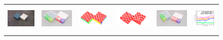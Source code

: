 \begin{figure}[t!]  %
  \begin{centering} 
    \begin{tabular}{p{}p{}p{}p{}p{}p{}}
    \includegraphics[height=1.35cm]{figures/scene1/image_before.jpg}
&    \includegraphics[height=1.35cm]{figures/scene1/pcl_before.png}
&    \includegraphics[height=1.35cm]{figures/scene1/segments.png}
&    \includegraphics[height=1.35cm]{figures/scene1/labels.png}
&    \includegraphics[height=1.35cm]{figures/scene1/pcl_after.png}    
&    \includegraphics[height=1.35cm]{figures/scene1/distances.png}\\


\end{tabular}
\end{centering}
\end{figure}

